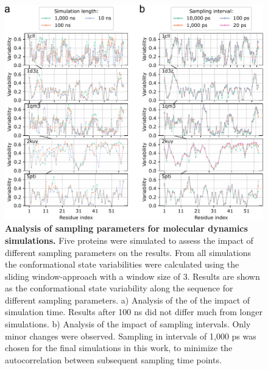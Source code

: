 \begin{figure}[H]
    \centering
    \includegraphics[width=1\linewidth]{constava//sup_figs/supfig4.pdf}
    \caption{\textbf{Analysis of sampling parameters for molecular dynamics simulations.} Five proteins were simulated to assess the impact of different sampling parameters on the results. From all simulations the conformational state variabilities were calculated using the sliding window-approach with a window size of 3. Results are shown as the conformational state variability along the sequence for different sampling parameters. a) Analysis of the of the impact of simulation time. Results after 100 ns did not differ much from longer simulations. b) Analysis of the impact of sampling intervals. Only minor changes were observed. Sampling in intervals of 1,000 ps was chosen for the final simulations in this work, to minimize the autocorrelation between subsequent sampling time points.}
    \label{fig:sup_fig_constava:MD_parameters}
\end{figure}


